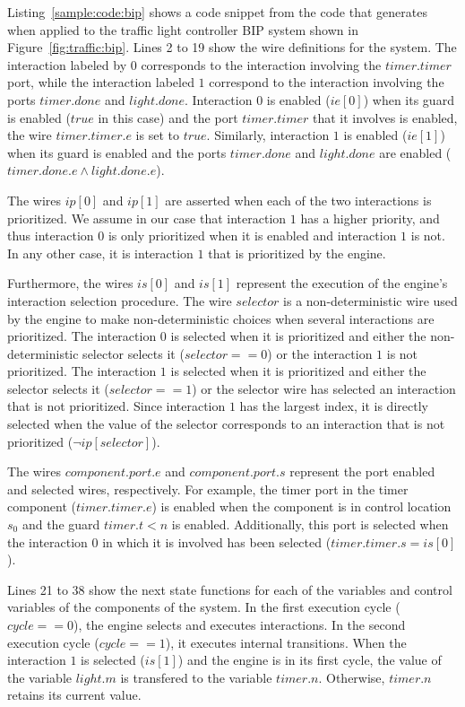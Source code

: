 Listing~\ref{sample:code:bip} shows a code snippet from the code that \biptool{} generates
when applied to the traffic light controller BIP system shown in Figure~\ref{fig:traffic:bip}.
Lines 2 to 19 show the wire definitions for the system. The interaction 
labeled by $0$ corresponds to the interaction involving the $timer.timer$
port, while the interaction labeled $1$ correspond to the interaction 
involving the ports $timer.done$ and $light.done$. 
Interaction $0$ is enabled ($ie[0]$) when its guard is enabled ($true$ 
in this case) and the port $timer.timer$ that it involves is enabled, 
\ie{} the wire $timer.timer.e$ is set to $true$. 
Similarly, interaction $1$ is enabled ($ie[1]$) when its guard is
enabled and the ports $timer.done$ and $light.done$ are enabled 
($timer.done.e \land light.done.e$).

The wires $ip[0]$ and $ip[1]$ are asserted when each of the two interactions 
is prioritized. We assume in our case that interaction $1$ has a higher
priority, and thus interaction $0$ is only prioritized when it is enabled
and interaction $1$ is not. In any other case, it is interaction $1$ that
is prioritized by the engine. 

Furthermore, the wires $is[0]$ and $is[1]$ represent the execution of the 
engine's interaction selection procedure. The wire $selector$ is
a non-deterministic wire used by the engine to make non-deterministic
choices when several interactions are prioritized. 
The interaction $0$ is selected
when it is prioritized and either the non-deterministic selector 
selects it ($selector == 0$)
or the interaction $1$ is not prioritized. 
The interaction $1$ is selected when it is prioritized and either 
the selector selects it ($selector == 1$) or the selector wire
has selected an interaction that is not prioritized. Since interaction
$1$ has the largest index, it is
directly selected when the value of the selector corresponds
to an interaction that is not prioritized ($\lnot ip[selector]$).

The wires $component.port.e$ and $component.port.s$ represent the 
port enabled and selected wires, respectively. 
For example, the timer port 
in the timer component ($timer.timer.e$) is enabled when the 
component is in control location $s_0$ and the guard $timer.t < n$ is
enabled. Additionally, this port is selected when the interaction $0$ 
in which it is involved has been selected ($timer.timer.s = is[0]$).

Lines 21 to 38 show the next state functions for each of the variables
and control variables of the components of the system. 
In the first execution cycle ($cycle == 0$), 
the engine selects and executes interactions.
In the second execution cycle ($cycle == 1$), 
it executes internal transitions. 
When the interaction $1$ is selected ($is[1]$) and the engine is 
in its first cycle, the value of the variable $light.m$ is transfered
to the variable $timer.n$. Otherwise, $timer.n$ retains its current
value.

